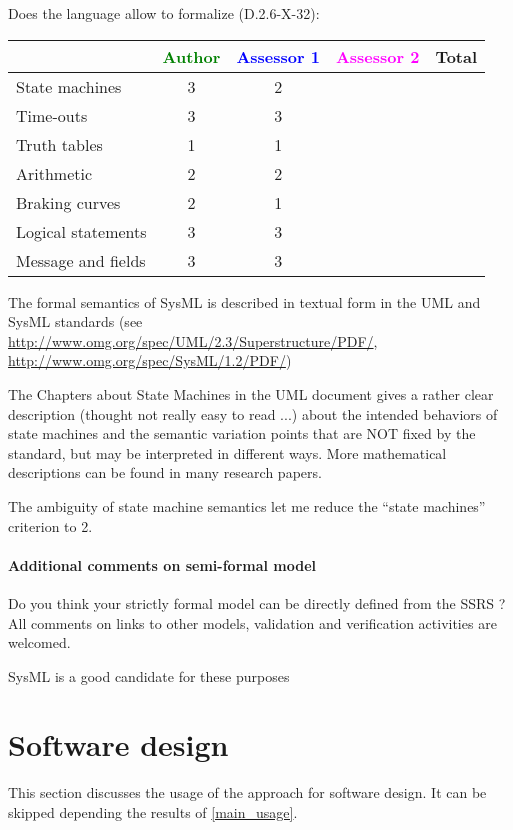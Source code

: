 Does the language allow to  formalize (D.2.6-X-32):

\begin{tabular}{|l | c | c | c | c|}
\hline
& \textcolor{green}{Author} & \textcolor{blue}{Assessor 1} & \textcolor{magenta}{Assessor 2} & Total \\
\hline 
State machines  &3 & 2& &  \\
\hline
Time-outs  &3 & 3& &  \\
\hline
Truth tables  &1 & 1& &  \\
\hline
Arithmetic  & 2& 2& &  \\
\hline
Braking curves  &2 & 1& &  \\
\hline
Logical statements &3 & 3& &  \\
\hline
Message and fields &3 & 3& &  \\
\hline
\end{tabular}
\begin{author_comment}

The formal semantics of SysML is described in textual form in the UML and SysML standards
(see \url{http://www.omg.org/spec/UML/2.3/Superstructure/PDF/}, \url{http://www.omg.org/spec/SysML/1.2/PDF/})

The Chapters about State Machines in the UML
document gives a rather clear description (thought not really easy
to read ...) about the intended behaviors of state machines and the
semantic variation points that are NOT fixed by the standard, but may
be interpreted in different ways. More mathematical descriptions can
be found in  many research papers.
\end{author_comment}

\begin{assessor1}
The ambiguity of state machine semantics let me reduce the "`state machines"' criterion to 2. 
\end{assessor1}


\paragraph{Additional comments on semi-formal  model} Do you think your strictly formal  model can be directly defined from the SSRS ?
All comments on links to  other models, validation and verification activities are welcomed.

\begin{author_comment}
SysML is a good candidate for these purposes
\end{author_comment}
\section{Software design}
This section discusses the usage of the approach for software design.
It can be skipped depending the results of \ref{main_usage}.

